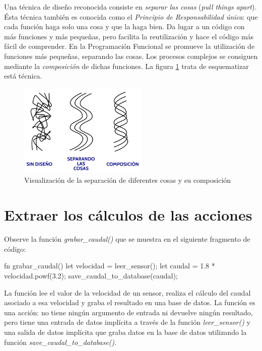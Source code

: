 Una técnica de diseño reconocida consiste en \textit{separar las cosas} (\textit{pull things apart}). Ésta técnica también es conocida como el \textit{Principio de Responsabilidad única}:  que cada función haga solo una cosa y que la haga bien. Da lugar a un código con más funciones y más pequeñas, pero facilita la reutilización y hace el código más fácil de comprender. En la Programación Funcional se promueve la utilización de funciones más pequeñas, separando las cosas. Los procesos complejos se consiguen mediante la \textit{composición} de dichas funciones. La figura \ref{fig_composicion_1} trata de esquematizar está técnica.

\begin{figure}[htb]
   \begin{center}
      \includegraphics[width=0.55\textwidth]{img/composicion_1.png}
      \caption{Visualización de la separación de diferentes cosas y su composición}
      \label{fig_composicion_1}
   \end{center}
\end{figure}

\section{Extraer los cálculos de las acciones}
\noindent Observe la función \textit{grabar\_caudal()} que se muestra en el siguiente fragmento de código:

\vspace{0.7em}
\begin{Codigo}
   fn grabar_caudal() {
      let velocidad = leer_sensor();
      let caudal = 1.8 * velocidad.powf(3.2);
      save_caudal_to_database(caudal);
   }
\end{Codigo}

La función lee el valor de la velocidad de un sensor, realiza el cálculo del caudal asociado a esa velocidad y graba el resultado en una base de datos. La función es una acción: no tiene ningún argumento de entrada ni devuelve ningún resultado, pero tiene una entrada de datos implícita a través de la función \textit{leer\_sensor()} y una salida de datos implícita que graba datos en la base de datos utilizando la función \textit{save\_caudal\_to\_database()}.  


